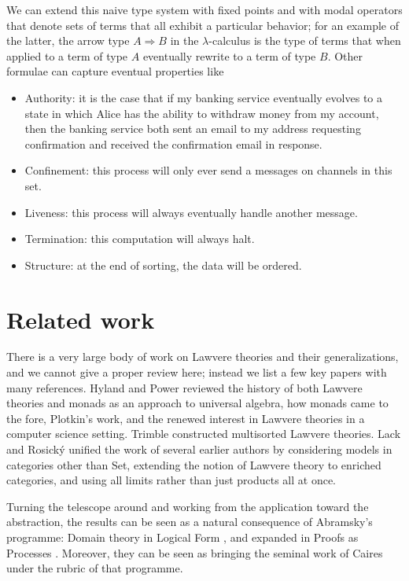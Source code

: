 \documentclass{llncs}
\begin{document}
  We can extend this naive type system with fixed points and with modal operators that denote sets of terms that all exhibit a particular behavior; for an example of the latter, the arrow type $A \Rightarrow B$ in the $\lambda$-calculus is the type of terms that when applied to a term of type $A$ eventually rewrite to a term of type $B$.  Other formulae can capture eventual properties like
\begin{itemize}
  \item Authority: it is the case that if my banking service eventually evolves to a state in which Alice has the ability to withdraw money from my account, then the banking service both sent an email to my address requesting confirmation and received the confirmation email in response.
  \item Confinement: this process will only ever send a messages on channels in this set.
  \item Liveness: this process will always eventually handle another message.
  \item Termination: this computation will always halt.
  \item Structure: at the end of sorting, the data will be ordered.
\end{itemize}

\section{Related work}

There is a very large body of work on Lawvere theories and their
generalizations, and we cannot give a proper review here; instead we
list a few key papers with many references.  Hyland and Power
\cite{DBLP:journals/entcs/HylandP07} reviewed the history of both
Lawvere theories and monads as an approach to universal algebra, how
monads came to the fore, Plotkin's work, and the renewed interest in
Lawvere theories in a computer science setting.  Trimble
\cite{Trimble} constructed multisorted Lawvere theories.  Lack and
Rosick\'y \cite{DBLP:journals/acs/LackR11} unified the work of several
earlier authors by considering models in categories other than Set,
extending the notion of Lawvere theory to enriched categories, and
using all limits rather than just products all at once.

Turning the telescope around and working from the application toward
the abstraction, the results can be seen as a natural consequence of
Abramsky's programme: Domain theory in Logical Form
\cite{DBLP:journals/apal/Abramsky91}, and expanded in Proofs as
Processes \cite{Abramsky:1992:PP:194588.194591}. Moreover, they can be
seen as bringing the seminal work of Caires \cite{Caires} under the
rubric of that programme.
\end{document}
